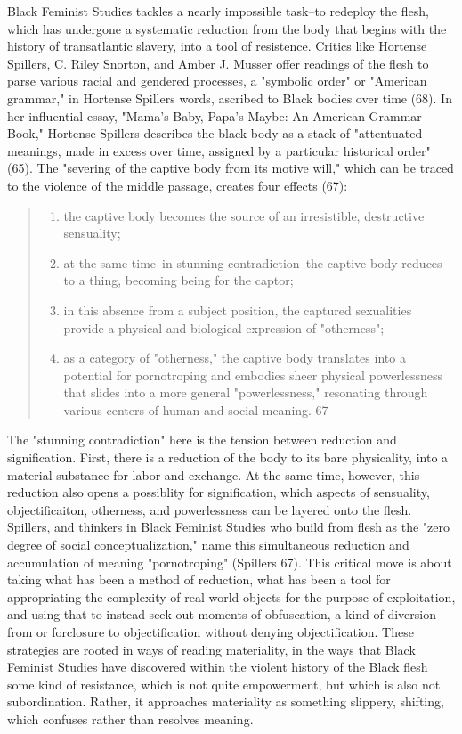 \documentclass[11pt]{article}
\begin{document}
Black Feminist Studies tackles a nearly impossible task--to redeploy
the flesh, which has undergone a systematic reduction from the body
that begins with the history of transatlantic slavery, into a tool of
resistence. Critics like Hortense Spillers, C. Riley Snorton, and
Amber J. Musser offer readings of the flesh to parse various racial
and gendered processes, a "symbolic order" or "American grammar," in
Hortense Spillers words, ascribed to Black bodies over time (68). In
her influential essay, "Mama's Baby, Papa's Maybe: An American Grammar
Book," Hortense Spillers describes the black body as a stack of
"attentuated meanings, made in excess over time, assigned by a
particular historical order" (65). The "severing of the captive body
from its motive will," which can be traced to the violence of the
middle passage, creates four effects (67):
\begin{quote}
\begin{enumerate}
\item the captive body becomes the source of an irresistible, destructive
sensuality;
\item at the same time--in stunning contradiction--the captive body
reduces to a thing, becoming being for the captor;
\item in this absence from a subject position, the captured sexualities
provide a physical and biological expression of "otherness";
\item as a category of "otherness," the captive body translates into a
potential for pornotroping and embodies sheer physical
powerlessness that slides into a more general "powerlessness,"
resonating through various centers of human and social meaning. 67
\end{enumerate}
\end{quote}
The "stunning contradiction" here is the tension between reduction and
signification. First, there is a reduction of the body to its bare
physicality, into a material substance for labor and exchange. At the
same time, however, this reduction also opens a possiblity for
signification, which aspects of sensuality, objectificaiton,
otherness, and powerlessness can be layered onto the flesh.  Spillers,
and thinkers in Black Feminist Studies who build from flesh as the
"zero degree of social conceptualization," name this simultaneous
reduction and accumulation of meaning "pornotroping" (Spillers
67). This critical move is about taking what has been a method of
reduction, what has been a tool for appropriating the complexity of
real world objects for the purpose of exploitation, and using that to
instead seek out moments of obfuscation, a kind of diversion from or
forclosure to objectification without denying objectification. These
strategies are rooted in ways of reading materiality, in the ways that
Black Feminist Studies have discovered within the violent history of
the Black flesh some kind of resistance, which is not quite
empowerment, but which is also not subordination. Rather, it
approaches materiality as something slippery, shifting, which confuses
rather than resolves meaning.
\end{document}
